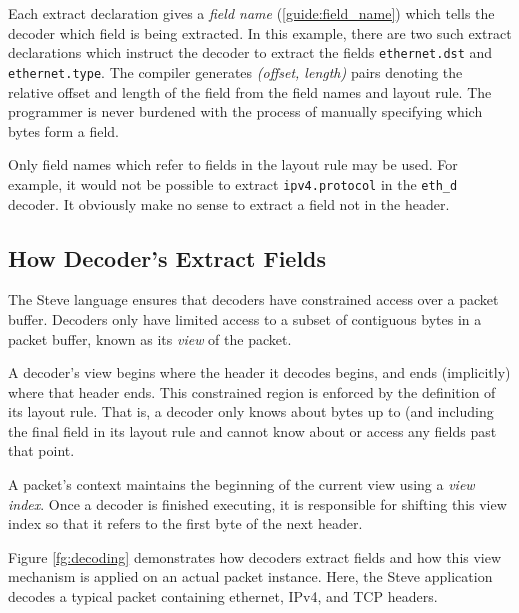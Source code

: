 Each extract declaration gives a \emph{field name} (\ref{guide:field_name}) 
which tells the decoder which field is being extracted. 
In this example, there are
two such extract declarations which instruct the decoder to extract
the fields \texttt{ethernet.dst} and \texttt{ethernet.type}.
The compiler generates \textit{(offset, length)} pairs 
denoting the relative offset and length of the field
from the field names and layout rule. 
The programmer is never burdened with the process of manually specifying
which bytes form a field.

Only field names which refer to fields in the layout rule may be used. For example, it would not be possible to extract \texttt{ipv4.protocol} in the \texttt{eth\_d} decoder. 
It obviously make no sense to extract a field not in the header. 

\subsection{How Decoder's Extract Fields} \label{tut:extract_how}

The Steve language ensures that decoders have constrained
access over a packet buffer. Decoders only have limited
access to a subset of contiguous bytes in a packet buffer, 
known as its \emph{view} of the packet.

A decoder's view begins where the header it decodes begins, and ends
(implicitly) where that header ends. 
This constrained region is enforced by the definition of its layout rule. 
That is, a decoder only knows about bytes up to (and including the final field in
its layout rule and cannot know about or access any fields past that point.

A packet's context maintains the beginning of the current view using
a \emph{view index}. Once a decoder is finished executing, it is
responsible for shifting this view index so that it refers to the
first byte of the next header.

Figure \ref{fg:decoding} demonstrates how decoders extract fields and
how this view mechanism is applied on an actual packet instance. 
Here, the Steve application decodes a typical packet 
containing ethernet, IPv4, and TCP headers.

